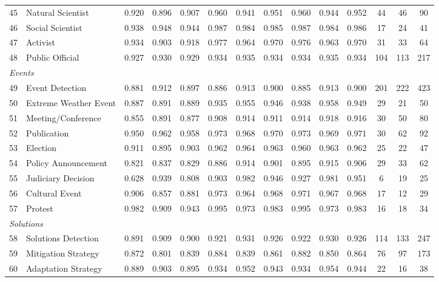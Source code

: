 {\begin{longtable}{p{0.4cm}p{5.5cm}cccccccccccc}
45 & Natural Scientist & 0.920 & 0.896 & 0.907 & 0.960 & 0.941 & 0.951 & 0.960 & 0.944 & 0.952 & 44 & 46 & 90 \\
46 & Social Scientist & 0.938 & 0.948 & 0.944 & 0.987 & 0.984 & 0.985 & 0.987 & 0.984 & 0.986 & 17 & 24 & 41 \\
47 & Activist & 0.934 & 0.903 & 0.918 & 0.977 & 0.964 & 0.970 & 0.976 & 0.963 & 0.970 & 31 & 33 & 64 \\
48 & Public Official & 0.927 & 0.930 & 0.929 & 0.934 & 0.935 & 0.934 & 0.934 & 0.935 & 0.934 & 104 & 113 & 217 \\
\midrule
\multicolumn{14}{l}{\textit{Events}} \\
49 & Event Detection & 0.881 & 0.912 & 0.897 & 0.886 & 0.913 & 0.900 & 0.885 & 0.913 & 0.900 & 201 & 222 & 423 \\
50 & Extreme Weather Event & 0.887 & 0.891 & 0.889 & 0.935 & 0.955 & 0.946 & 0.938 & 0.958 & 0.949 & 29 & 21 & 50 \\
51 & Meeting/Conference & 0.855 & 0.891 & 0.877 & 0.908 & 0.914 & 0.911 & 0.914 & 0.918 & 0.916 & 30 & 50 & 80 \\
52 & Publication & 0.950 & 0.962 & 0.958 & 0.973 & 0.968 & 0.970 & 0.973 & 0.969 & 0.971 & 30 & 62 & 92 \\
53 & Election & 0.911 & 0.895 & 0.903 & 0.962 & 0.964 & 0.963 & 0.960 & 0.963 & 0.962 & 25 & 22 & 47 \\
54 & Policy Announcement & 0.821 & 0.837 & 0.829 & 0.886 & 0.914 & 0.901 & 0.895 & 0.915 & 0.906 & 29 & 33 & 62 \\
55 & Judiciary Decision & 0.628 & 0.939 & 0.808 & 0.903 & 0.982 & 0.946 & 0.927 & 0.981 & 0.951 & 6 & 19 & 25 \\
56 & Cultural Event & 0.906 & 0.857 & 0.881 & 0.973 & 0.964 & 0.968 & 0.971 & 0.967 & 0.968 & 17 & 12 & 29 \\
57 & Protest & 0.982 & 0.909 & 0.943 & 0.995 & 0.973 & 0.983 & 0.995 & 0.973 & 0.983 & 16 & 18 & 34 \\
\midrule  
\multicolumn{14}{l}{\textit{Solutions}} \\
58 & Solutions Detection & 0.891 & 0.909 & 0.900 & 0.921 & 0.931 & 0.926 & 0.922 & 0.930 & 0.926 & 114 & 133 & 247 \\
59 & Mitigation Strategy & 0.872 & 0.801 & 0.839 & 0.884 & 0.839 & 0.861 & 0.882 & 0.850 & 0.864 & 76 & 97 & 173 \\
60 & Adaptation Strategy & 0.889 & 0.903 & 0.895 & 0.934 & 0.952 & 0.943 & 0.934 & 0.954 & 0.944 & 22 & 16 & 38 \\

\end{longtable}}
